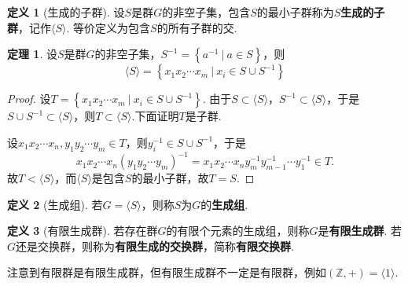 \documentclass[12pt]{ctexart}
\theoremstyle{definition}
\newtheorem{definition}{定义}
\newtheorem{theorem}{定理}
\theoremstyle{plain}
\begin{document}
	\begin{definition}[生成的子群]
		设$S$是群$G$的非空子集，包含$S$的最小子群称为$S$\textbf{生成的子群}，记作$\langle S\rangle$. 等价定义为包含$S$的所有子群的交.
	\end{definition}
	\begin{theorem}
		设$S$是群$G$的非空子集，$S^{-1}=\left\{a^{-1}\ |\ a\in S\right\}$，则
		$$\langle S\rangle=\left\{x_1x_2\cdots x_m\ |\ x_i\in S\cup S^{-1}\right\}$$
	\end{theorem}
	\begin{proof}
		设$T=\left\{x_1x_2\cdots x_m\ |\ x_i\in S\cup S^{-1}\right\}$. 由于$S\subset\langle S\rangle$，$S^{-1}\subset\langle S\rangle$，于是$S\cup S^{-1}\subset\langle S\rangle$，则$T\subset\langle S\rangle$.下面证明$T$是子群.
		
		设$x_1x_2\cdots x_n,y_1y_2\cdots y_m\in T$，则$y_i^{-1}\in S\cup S^{-1}$，于是
		$$x_1x_2\cdots x_n(y_1y_2\cdots y_m)^{-1}=x_1x_2\cdots x_ny_m^{-1}y_{m-1}^{-1}\cdots y_1^{-1}\in T.$$
		故$T<\langle S\rangle$，而$\langle S\rangle$是包含$S$的最小子群，故$T=S$.
	\end{proof}
	\begin{definition}[生成组]
		若$G=\langle S\rangle$，则称$S$为$G$的\textbf{生成组}.
	\end{definition}
	\begin{definition}[有限生成群]
		若存在群$G$的有限个元素的生成组，则称$G$是\textbf{有限生成群}. 若$G$还是交换群，则称为\textbf{有限生成的交换群}，简称\textbf{有限交换群}.
	\end{definition}
	注意到有限群是有限生成群，但有限生成群不一定是有限群，例如$(\mathbb{Z},+)=\langle 1\rangle$.
\end{document}
